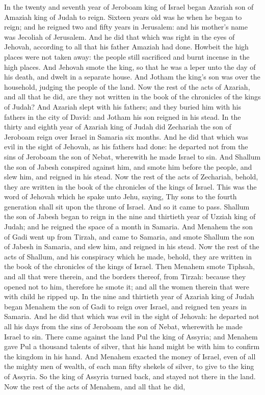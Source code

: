In the twenty and seventh year of Jeroboam king of Israel began Azariah son of Amaziah king of Judah to reign. Sixteen years old was he when he began to reign; and he reigned two and fifty years in Jerusalem: and his mother’s name was Jecoliah of Jerusalem. And he did that which was right in the eyes of Jehovah, according to all that his father Amaziah had done. Howbeit the high places were not taken away: the people still sacrificed and burnt incense in the high places. And Jehovah smote the king, so that he was a leper unto the day of his death, and dwelt in a separate house. And Jotham the king’s son was over the household, judging the people of the land. Now the rest of the acts of Azariah, and all that he did, are they not written in the book of the chronicles of the kings of Judah? And Azariah slept with his fathers; and they buried him with his fathers in the city of David: and Jotham his son reigned in his stead.  In the thirty and eighth year of Azariah king of Judah did Zechariah the son of Jeroboam reign over Israel in Samaria six months. And he did that which was evil in the sight of Jehovah, as his fathers had done: he departed not from the sins of Jeroboam the son of Nebat, wherewith he made Israel to sin. And Shallum the son of Jabesh conspired against him, and smote him before the people, and slew him, and reigned in his stead. Now the rest of the acts of Zechariah, behold, they are written in the book of the chronicles of the kings of Israel. This was the word of Jehovah which he spake unto Jehu, saying, Thy sons to the fourth generation shall sit upon the throne of Israel. And so it came to pass.  Shallum the son of Jabesh began to reign in the nine and thirtieth year of Uzziah king of Judah; and he reigned the space of a month in Samaria. And Menahem the son of Gadi went up from Tirzah, and came to Samaria, and smote Shallum the son of Jabesh in Samaria, and slew him, and reigned in his stead. Now the rest of the acts of Shallum, and his conspiracy which he made, behold, they are written in the book of the chronicles of the kings of Israel. Then Menahem smote Tiphsah, and all that were therein, and the borders thereof, from Tirzah: because they opened not to him, therefore he smote it; and all the women therein that were with child he ripped up.  In the nine and thirtieth year of Azariah king of Judah began Menahem the son of Gadi to reign over Israel, and reigned ten years in Samaria. And he did that which was evil in the sight of Jehovah: he departed not all his days from the sins of Jeroboam the son of Nebat, wherewith he made Israel to sin. There came against the land Pul the king of Assyria; and Menahem gave Pul a thousand talents of silver, that his hand might be with him to confirm the kingdom in his hand. And Menahem exacted the money of Israel, even of all the mighty men of wealth, of each man fifty shekels of silver, to give to the king of Assyria. So the king of Assyria turned back, and stayed not there in the land. Now the rest of the acts of Menahem, and all that he did, 